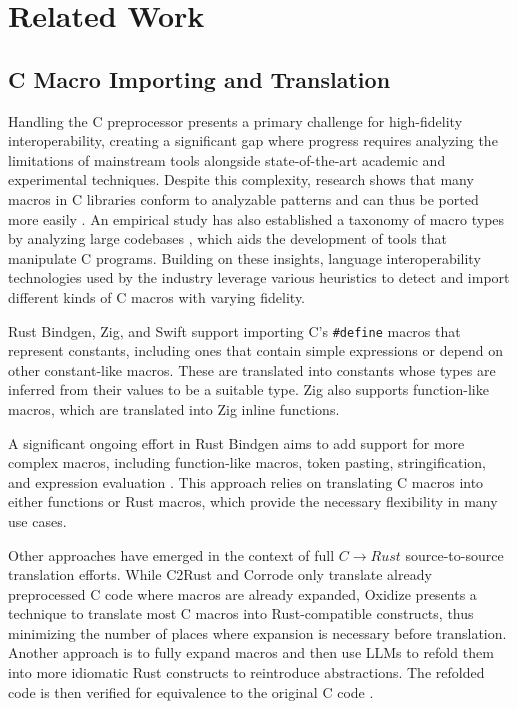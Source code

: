 \section{Related Work}
\label{sec:related_work}
\subsection{C Macro Importing and Translation}
\label{ssec:macro}

Handling the C preprocessor presents a primary challenge for high-fidelity interoperability, creating a significant gap where progress requires analyzing the limitations of mainstream tools alongside state-of-the-art academic and experimental techniques. Despite this complexity, research shows that many macros in C libraries conform to analyzable patterns and can thus be ported more easily \cite{Pappas_2024}. An empirical study has also established a taxonomy of macro types by analyzing large codebases \cite{usage-of-macros-study}, which aids the development of tools that manipulate C programs. Building on these insights, language interoperability technologies used by the industry leverage various heuristics to detect and import different kinds of C macros with varying fidelity.

Rust Bindgen, Zig, and Swift support importing C's \texttt{\#define} macros that represent constants, including ones that contain simple expressions or depend on other constant-like macros. These are translated into constants whose types are inferred from their values to be a suitable type. Zig also supports function-like macros, which are translated into Zig inline functions.

A significant ongoing effort in Rust Bindgen aims to add support for more complex macros, including function-like macros, token pasting, stringification, and expression evaluation \cite{bindgen-cmacro-rs}. This approach relies on translating C macros into either functions or Rust macros, which provide the necessary flexibility in many use cases.

Other approaches have emerged in the context of full $C \rightarrow Rust$ source-to-source translation efforts. While C2Rust \cite{c2rust} and Corrode \cite{corrode} only translate already preprocessed C code where macros are already expanded, Oxidize \cite{oxidize-wip} presents a technique to translate most C macros into Rust-compatible constructs, thus minimizing the number of places where expansion is necessary before translation. Another approach is to fully expand macros and then use LLMs to refold them into more idiomatic Rust constructs to reintroduce abstractions. The refolded code is then verified for equivalence to the original C code \cite{rust-macro-refolding}.

